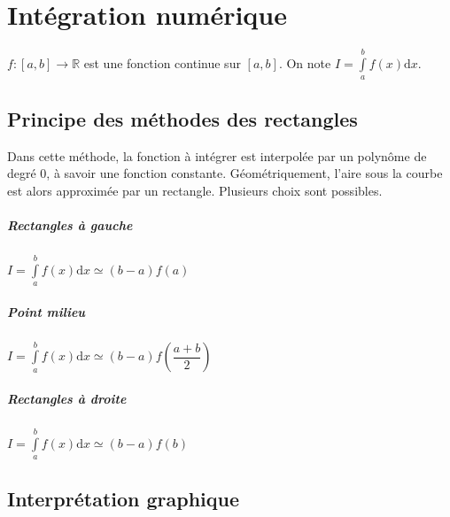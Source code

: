 \setchapterpreamble[u]{\margintoc}
\chapter{Intégration numérique}




\begin{hypo}  $f:[a,b]\rightarrow \mathbb{R}$ est une fonction continue sur $[a,b]$. On note $I = \int\limits_a^{b} f(x) \mathrm{d}x $.
\end{hypo}

\section{Principe des méthodes des rectangles}
\begin{defi}
Dans cette méthode, la fonction à intégrer est interpolée par un polynôme de degré 0, à savoir une fonction constante. Géométriquement, l'aire sous la courbe est alors approximée par un rectangle. Plusieurs choix sont possibles.

\paragraph*{Rectangles à gauche}
$I = \int\limits_a^{b} f(x) \mathrm{d}x \simeq \left(b-a\right) f(a) $

\paragraph*{Point milieu}
$I = \int\limits_a^{b} f(x) \mathrm{d}x \simeq \left(b-a\right) f\left(\dfrac{a+b}{2}\right) $

\paragraph*{Rectangles à droite}
$I = \int\limits_a^{b} f(x) \mathrm{d}x \simeq \left(b-a\right) f(b) $

\end{defi}

\section{Interprétation graphique}

